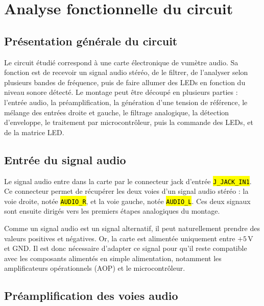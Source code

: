 \documentclass{report}
\title{\DocName}
\author{\DocAuthors}
\date{\textbf{JUNIA - ISEN - AP3} \url{https://github.com/CharlesBta/Junia_Projet_Microcontroleurs_AP3.git}}
\let\OldTexttt\texttt
\renewcommand{\texttt}[1]{\OldTexttt{\hl{#1}}}
\begin{document}
\maketitle
\tableofcontents

\chapter{Analyse fonctionnelle du circuit}

\section{Présentation générale du circuit}

Le circuit étudié correspond à une carte électronique de vumètre audio. Sa fonction est de recevoir un signal audio stéréo, de le filtrer, de l'analyser selon plusieurs bandes de fréquence, puis de faire allumer des LEDs en fonction du niveau sonore détecté. Le montage peut être découpé en plusieurs parties : l'entrée audio, la préamplification, la génération d'une tension de référence, le mélange des entrées droite et gauche, le filtrage analogique, la détection d'enveloppe, le traitement par microcontrôleur, puis la commande des LEDs, et de la matrice LED.

\section{Entrée du signal audio}

Le signal audio entre dans la carte par le connecteur jack d'entrée \texttt{J\_JACK\_IN1}. Ce connecteur permet de récupérer les deux voies d'un signal audio stéréo : la voie droite, notée \texttt{AUDIO\_R}, et la voie gauche, notée \texttt{AUDIO\_L}. Ces deux signaux sont ensuite dirigés vers les premiers étapes analogiques du montage.

Comme un signal audio est un signal alternatif, il peut naturellement prendre des valeurs positives et négatives. Or, la carte est alimentée uniquement entre \(+5\,\mathrm{V}\) et \(\mathrm{GND}\). Il est donc nécessaire d'adapter ce signal pour qu'il reste compatible avec les composants alimentés en simple alimentation, notamment les amplificateurs opérationnels (AOP) et le microcontrôleur.

\section{Préamplification des voies audio}
\end{document}
